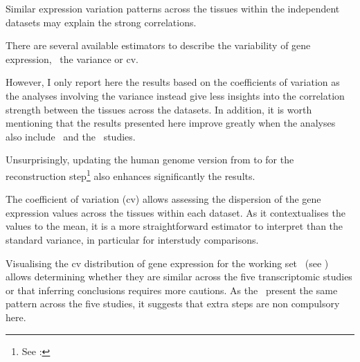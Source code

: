 Similar expression variation patterns across the tissues
within the independent datasets may explain the strong correlations.

There are several available estimators to describe
the variability of gene expression,
\eg\ the variance or \gls{cv}.

However,
I only report here the results based on the coefficients of variation
as the analyses involving the variance instead give
less insights into the correlation strength
between the tissues across the datasets.
In addition, it is worth mentioning that the results presented here
improve greatly when the analyses also include \uhlen\ and the \gtex\ studies.
\begin{comment}
Indeed, preliminary results (only based on \castle, \vt\ and \ibm\ studies)
were far worse.
\end{comment}
Unsurprisingly, updating the human genome version from  to 
for the reconstruction
step\footnote{See : }
also enhances significantly the results.

The coefficient of variation (\gls{cv}) allows assessing
the dispersion of the gene expression values
across the tissues within each dataset.
As it contextualises the values to the mean,
it is a more straightforward estimator to interpret than
the standard variance,
in particular for interstudy comparisons.

Visualising the \gls{cv} distribution of
gene expression for the working set \setOne\ (see )
allows determining whether they are similar across the five transcriptomic studies
or that inferring conclusions requires more cautions.
As the \cvs\ present the same pattern across the five studies,
it suggests that extra steps are non compulsory here.

